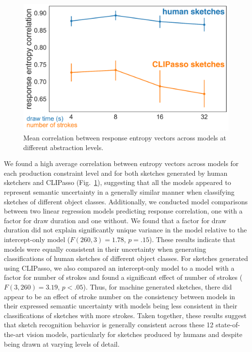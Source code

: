 \documentclass[10pt,letterpaper]{article}
\begin{document}
\begin{figure}[h!]
    \centering
    \includegraphics[width=.9\linewidth]
    {figures/VAB_H_cor_vs_complexity.pdf}
    \vspace{-1em}
    \caption{Mean correlation between response entropy vectors across models at different abstraction levels.}
    \label{fig:VAB_H_cor_vs_complexity}
    \vspace{-1em}
\end{figure}
We found a high average correlation between entropy vectors across models for each production constraint level and for both sketches generated by human sketchers and CLIPasso (Fig.~\ref{fig:VAB_H_cor_vs_complexity}), suggesting that all the models appeared to represent semantic uncertainty in a generally similar manner when classifying sketches of different object classes. 
Additionally, we conducted model comparisons between two linear regression models predicting response correlation, one with a factor for draw duration and one without. 
We found that a factor for draw duration did not explain significantly unique variance in the model relative to the intercept-only model ($F(260,3) = 1.78$, $p = .15$). 
These results indicate that models were equally consistent in their uncertainty when generating classifications of human sketches of different object classes. 
For sketches generated using CLIPasso, we also compared an intercept-only model to a model with a factor for number of strokes and found a significant effect of number of strokes ($F (3,260) = 3.19$, $p < .05$).
Thus, for machine generated sketches, there did appear to be an effect of stroke number on the consistency between models in their expressed semantic uncertainty with models being less consistent in their classifications of sketches with more strokes. 
Taken together, these results suggest that sketch recognition behavior is generally consistent across these 12 state-of-the-art vision models, particularly for sketches produced by humans and despite being drawn at varying levels of detail. 
\end{document}
